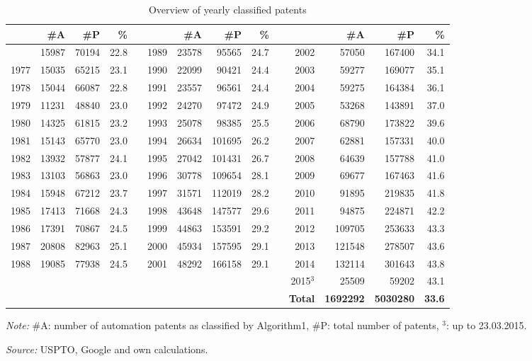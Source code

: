 \begin{table}[!htb]
\begin{small}
\begin{threeparttable}
\caption{{\normalsize Overview of yearly classified patents}}
\label{table:table_yearsstats}
\begin{tabular}{rrrrrrrrrrrrrr}
\toprule \addlinespace[0.5em]
 & \textbf{\#A} & \textbf{\#P} & \textbf{\%} & \phantom{aaa} & & \textbf{\#A} & \textbf{\#P} & \textbf{\%} & \phantom{aaa} & & \textbf{\#A} & \textbf{\#P} & \textbf{\%}\tabularnewline[0.1cm]
\midrule \addlinespace[0.5em]
1976 & 15987 & 70194 & 22.8 & & 1989 & 23578 & 95565 & 24.7 & & 2002 & 57050 & 167400 & 34.1 \tabularnewline[0.1cm]
1977 & 15035 & 65215 & 23.1 & & 1990 & 22099 & 90421 & 24.4 & & 2003 & 59277 & 169077 & 35.1 \tabularnewline[0.1cm]
1978 & 15044 & 66087 & 22.8 & & 1991 & 23557 & 96561 & 24.4 & & 2004 & 59275 & 164384 & 36.1 \tabularnewline[0.1cm]
1979 & 11231 & 48840 & 23.0 & & 1992 & 24270 & 97472 & 24.9 & & 2005 & 53268 & 143891 & 37.0 \tabularnewline[0.1cm]
1980 & 14325 & 61815 & 23.2 & & 1993 & 25078 & 98385 & 25.5 & & 2006 & 68790 & 173822 & 39.6 \tabularnewline[0.1cm]
1981 & 15143 & 65770 & 23.0 & & 1994 & 26634 & 101695 & 26.2 & & 2007 & 62881 & 157331 & 40.0 \tabularnewline[0.1cm]
1982 & 13932 & 57877 & 24.1 & & 1995 & 27042 & 101431 & 26.7 & & 2008 & 64639 & 157788 & 41.0 \tabularnewline[0.1cm]
1983 & 13103 & 56863 & 23.0 & & 1996 & 30778 & 109654 & 28.1 & & 2009 & 69677 & 167463 & 41.6 \tabularnewline[0.1cm]
1984 & 15948 & 67212 & 23.7 & & 1997 & 31571 & 112019 & 28.2 & & 2010 & 91895 & 219835 & 41.8 \tabularnewline[0.1cm]
1985 & 17413 & 71668 & 24.3 & & 1998 & 43648 & 147577 & 29.6 & & 2011 & 94875 & 224871 & 42.2 \tabularnewline[0.1cm]
1986 & 17391 & 70867 & 24.5 & & 1999 & 44863 & 153591 & 29.2 & & 2012 & 109705 & 253633 & 43.3 \tabularnewline[0.1cm]
1987 & 20808 & 82963 & 25.1 & & 2000 & 45934 & 157595 & 29.1 & & 2013 & 121548 & 278507 & 43.6 \tabularnewline[0.1cm]
1988 & 19085 & 77938 & 24.5 & & 2001 & 48292 & 166158 & 29.1 & & 2014 & 132114 & 301643 & 43.8 \tabularnewline[0.1cm]
& & & & & & & & & & 2015$^3$ & 25509 & 59202 & 43.1  \tabularnewline[0.1cm]
& & & & & & & & & & \textbf{Total} & \textbf{1692292} & \textbf{5030280} & \textbf{33.6} \tabularnewline[0.1cm]
\bottomrule\end{tabular}
\begin{tablenotes}
\small
\item\textit{Note:} \#A: number of automation patents as classified by Algorithm1, \#P: total number of patents, $^3$: up to 23.03.2015.
\item\textit{Source:} USPTO, Google and own calculations.
\end{tablenotes}
\end{threeparttable}
\end{small}
\end{table}
